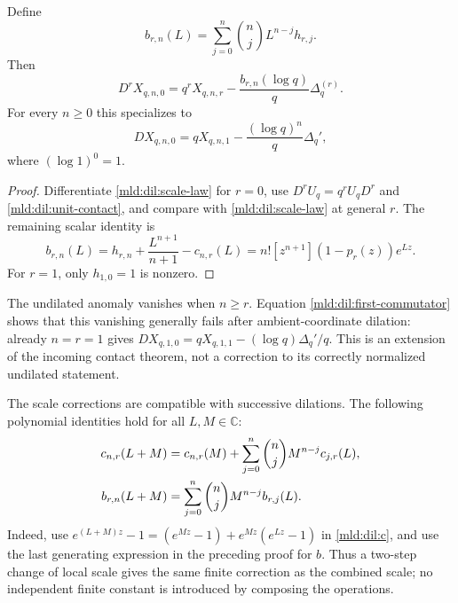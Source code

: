 \begin{corollary}
Define
\begin{equation}
 b_{r,n}(L)=\sum_{j=0}^n\binom nj L^{n-j}h_{r,j}.
 \label{mld:dil:b}
\end{equation}
Then
\begin{equation}
 \boxed{D^rX_{q,n,0}=q^rX_{q,n,r}
          -\frac{b_{r,n}(\log q)}q\Delta_q^{(r)}.}
 \label{mld:dil:commutator}
\end{equation}
For every $n\ge0$ this specializes to
\begin{equation}
 DX_{q,n,0}=qX_{q,n,1}
             -\frac{(\log q)^n}{q}\Delta_q',
 \label{mld:dil:first-commutator}
\end{equation}
where $(\log1)^0=1$.
\end{corollary}
\begin{proof}
Differentiate \eqref{mld:dil:scale-law} for $r=0$, use
$D^rU_q=q^rU_qD^r$ and \eqref{mld:dil:unit-contact}, and compare with
\eqref{mld:dil:scale-law} at general $r$.  The remaining scalar identity is
\[
 b_{r,n}(L)=h_{r,n}+\frac{L^{n+1}}{n+1}-c_{n,r}(L)
          =n![z^{n+1}](1-p_r(z))e^{Lz}.
\]
For $r=1$, only $h_{1,0}=1$ is nonzero.
\end{proof}

The undilated anomaly vanishes when $n\ge r$.  Equation
\eqref{mld:dil:first-commutator} shows that this vanishing generally fails
after ambient-coordinate dilation: already $n=r=1$ gives
$DX_{q,1,0}=qX_{q,1,1}-(\log q)\Delta_q'/q$.
This is an extension of the incoming contact theorem, not a correction
to its correctly normalized undilated statement.

The scale corrections are compatible with successive dilations.  The
following polynomial identities hold for all $L,M\in\mathbb C$:
\begin{align}
 c_{n,r}(L+M)&=c_{n,r}(M)
       +\sum_{j=0}^n\binom nj M^{n-j}c_{j,r}(L),\notag\\
 b_{r,n}(L+M)&=\sum_{j=0}^n\binom nj M^{n-j}b_{r,j}(L).
 \label{mld:dil:scale-composition}
\end{align}
Indeed, use $e^{(L+M)z}-1=(e^{Mz}-1)+e^{Mz}(e^{Lz}-1)$ in
\eqref{mld:dil:c}, and use the last generating expression in the preceding
proof for $b$.  Thus a two-step change of local scale gives the same
finite correction as the combined scale; no independent finite
constant is introduced by composing the operations.

